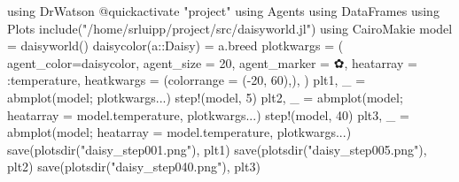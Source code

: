 \documentclass[
  english,
  russian,
  12pt,
  a4paper,
  DIV=11,
  numbers=noendperiod]{scrreprt}
\newenvironment{Shaded}{\begin{snugshade}}{\end{snugshade}}
\newcommand{\BuiltInTok}[1]{\textcolor[rgb]{0.00,0.23,0.31}{#1}}
\newcommand{\CharTok}[1]{\textcolor[rgb]{0.13,0.47,0.30}{#1}}
\newcommand{\DataTypeTok}[1]{\textcolor[rgb]{0.68,0.00,0.00}{#1}}
\newcommand{\FloatTok}[1]{\textcolor[rgb]{0.68,0.00,0.00}{#1}}
\newcommand{\FunctionTok}[1]{\textcolor[rgb]{0.28,0.35,0.67}{#1}}
\newcommand{\ImportTok}[1]{\textcolor[rgb]{0.00,0.46,0.62}{#1}}
\newcommand{\NormalTok}[1]{\textcolor[rgb]{0.00,0.23,0.31}{#1}}
\newcommand{\OperatorTok}[1]{\textcolor[rgb]{0.37,0.37,0.37}{#1}}
\newcommand{\PreprocessorTok}[1]{\textcolor[rgb]{0.68,0.00,0.00}{#1}}
\newcommand{\StringTok}[1]{\textcolor[rgb]{0.13,0.47,0.30}{#1}}
\begin{document}
\begin{Shaded}
\begin{Highlighting}[]
\ImportTok{using} \BuiltInTok{DrWatson}
\PreprocessorTok{@quickactivate} \StringTok{"project"}
\ImportTok{using} \BuiltInTok{Agents}
\ImportTok{using} \BuiltInTok{DataFrames}
\ImportTok{using} \BuiltInTok{Plots}
\FunctionTok{include}\NormalTok{(}\StringTok{"/home/srluipp/project/src/daisyworld.jl"}\NormalTok{)}
\ImportTok{using} \BuiltInTok{CairoMakie}
\NormalTok{model }\OperatorTok{=} \FunctionTok{daisyworld}\NormalTok{()}
\FunctionTok{daisycolor}\NormalTok{(a}\OperatorTok{::}\DataTypeTok{Daisy}\NormalTok{) }\OperatorTok{=}\NormalTok{ a.breed}
\NormalTok{plotkwargs }\OperatorTok{=}\NormalTok{ (}
\NormalTok{agent\_color}\OperatorTok{=}\NormalTok{daisycolor, agent\_size }\OperatorTok{=} \FloatTok{20}\NormalTok{, agent\_marker }\OperatorTok{=} \CharTok{\textquotesingle{}✿\textquotesingle{}}\NormalTok{,}
\NormalTok{heatarray }\OperatorTok{=} \OperatorTok{:}\NormalTok{temperature,}
\NormalTok{heatkwargs }\OperatorTok{=}\NormalTok{ (colorrange }\OperatorTok{=}\NormalTok{ (}\OperatorTok{{-}}\FloatTok{20}\NormalTok{, }\FloatTok{60}\NormalTok{),),}
\NormalTok{)}
\NormalTok{plt1, \_ }\OperatorTok{=} \FunctionTok{abmplot}\NormalTok{(model; plotkwargs}\OperatorTok{...}\NormalTok{)}
\FunctionTok{step!}\NormalTok{(model, }\FloatTok{5}\NormalTok{)}
\NormalTok{plt2, \_ }\OperatorTok{=} \FunctionTok{abmplot}\NormalTok{(model; heatarray }\OperatorTok{=}\NormalTok{ model.temperature, plotkwargs}\OperatorTok{...}\NormalTok{)}
\FunctionTok{step!}\NormalTok{(model, }\FloatTok{40}\NormalTok{)}
\NormalTok{plt3, \_ }\OperatorTok{=} \FunctionTok{abmplot}\NormalTok{(model; heatarray }\OperatorTok{=}\NormalTok{ model.temperature, plotkwargs}\OperatorTok{...}\NormalTok{)}
\FunctionTok{save}\NormalTok{(}\FunctionTok{plotsdir}\NormalTok{(}\StringTok{"daisy\_step001.png"}\NormalTok{), plt1)}
\FunctionTok{save}\NormalTok{(}\FunctionTok{plotsdir}\NormalTok{(}\StringTok{"daisy\_step005.png"}\NormalTok{), plt2)}
\FunctionTok{save}\NormalTok{(}\FunctionTok{plotsdir}\NormalTok{(}\StringTok{"daisy\_step040.png"}\NormalTok{), plt3)}
\end{Highlighting}
\end{Shaded}
\end{document}

